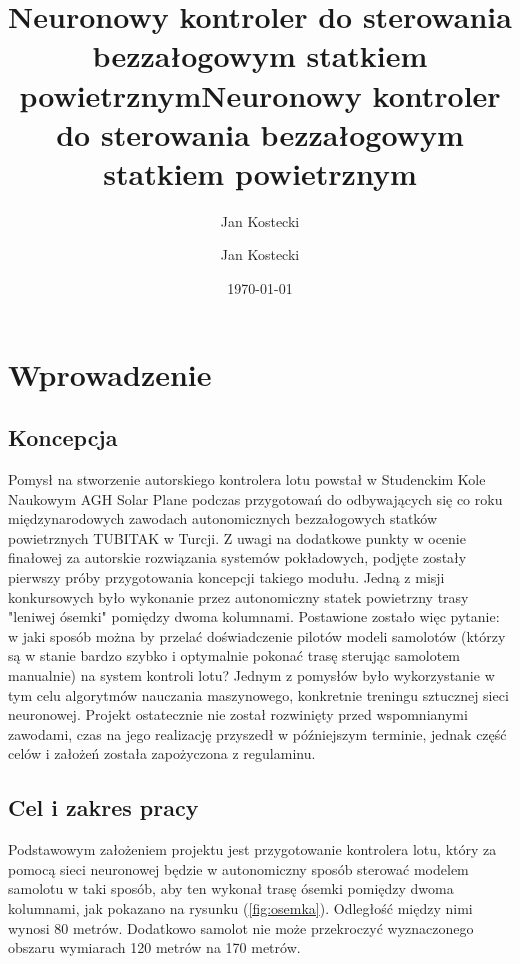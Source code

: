 \documentclass[12pt, a4paper]{article}
\title{Neuronowy kontroler do sterowania bezzałogowym statkiem powietrznym}
\author{Jan Kostecki}
\title{Neuronowy kontroler do sterowania bezzałogowym statkiem powietrznym}
\author{Jan Kostecki}
\date{\today}
\let\oldref\ref
\renewcommand{\ref}[1]{(\oldref{#1})}
\begin{document}
\onehalfspacing
\maketitle
\newpage
\tableofcontents

\clearpage

\section{Wprowadzenie}
\subsection{Koncepcja}

Pomysł na stworzenie autorskiego kontrolera lotu powstał w Studenckim Kole Naukowym AGH Solar Plane podczas przygotowań do odbywających się co roku międzynarodowych zawodach autonomicznych bezzałogowych statków powietrznych TUBITAK w Turcji. Z uwagi na dodatkowe punkty w ocenie finałowej za autorskie rozwiązania systemów pokładowych, podjęte zostały pierwszy próby przygotowania koncepcji takiego modułu. Jedną z misji konkursowych było wykonanie przez autonomiczny statek powietrzny trasy "leniwej ósemki" pomiędzy dwoma kolumnami. Postawione zostało więc pytanie: w jaki sposób można by przelać doświadczenie pilotów modeli samolotów (którzy są w stanie bardzo szybko i optymalnie pokonać trasę sterując samolotem manualnie) na system kontroli lotu? Jednym z pomysłów było wykorzystanie w tym celu algorytmów nauczania maszynowego, konkretnie treningu sztucznej sieci neuronowej. Projekt ostatecznie nie został rozwinięty przed wspomnianymi zawodami, czas na jego realizację przyszedł w późniejszym terminie, jednak część celów i założeń została zapożyczona z regulaminu.

\subsection{Cel i zakres pracy}
Podstawowym założeniem projektu jest przygotowanie kontrolera lotu, który za pomocą sieci neuronowej będzie w autonomiczny sposób sterować modelem samolotu w taki sposób, aby ten wykonał trasę ósemki pomiędzy dwoma kolumnami, jak pokazano na rysunku \ref{fig:osemka}. Odległość między nimi wynosi 80 metrów. Dodatkowo samolot nie może przekroczyć wyznaczonego obszaru  wymiarach 120 metrów na 170 metrów.
\end{document}
